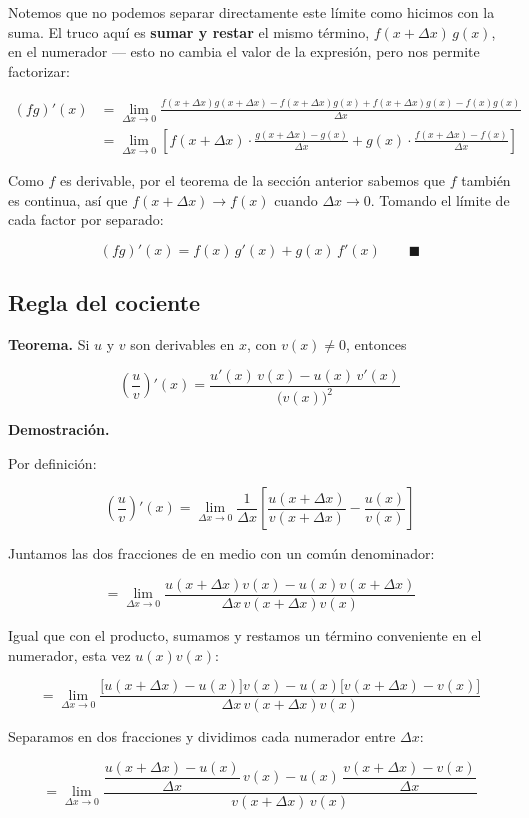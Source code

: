 \documentclass[12pt,tikz,border=5pt]{article}
\begin{document}
Notemos que no podemos separar directamente este límite como hicimos con la
suma. El truco aquí es \textbf{sumar y restar} el mismo término,
$f(x+\Delta x)\,g(x)$, en el numerador — esto no cambia el valor de la
expresión, pero nos permite factorizar:

\begin{align*}
(fg)'(x) &= \lim_{\Delta x\to 0}\frac{f(x+\Delta x)g(x+\Delta x) - f(x+\Delta x)g(x) + f(x+\Delta x)g(x) - f(x)g(x)}{\Delta x} \\[4pt]
&= \lim_{\Delta x\to 0}\left[f(x+\Delta x)\cdot\frac{g(x+\Delta x)-g(x)}{\Delta x} + g(x)\cdot\frac{f(x+\Delta x)-f(x)}{\Delta x}\right]
\end{align*}

Como $f$ es derivable, por el teorema de la sección anterior sabemos que
$f$ también es continua, así que $f(x+\Delta x)\to f(x)$ cuando
$\Delta x\to 0$. Tomando el límite de cada factor por separado:

$$(fg)'(x) = f(x)\,g'(x) + g(x)\,f'(x) \qquad \blacksquare$$

\subsection{Regla del cociente}

\textbf{Teorema.} Si $u$ y $v$ son derivables en $x$, con $v(x)\ne 0$,
entonces

$$\left(\frac{u}{v}\right)'(x) = \frac{u'(x)\,v(x) - u(x)\,v'(x)}{\big(v(x)\big)^2}$$

\textbf{Demostración.}

Por definición:

$$\left(\frac{u}{v}\right)'(x) = \lim_{\Delta x\to 0}\frac{1}{\Delta x}\left[\frac{u(x+\Delta x)}{v(x+\Delta x)} - \frac{u(x)}{v(x)}\right]$$

Juntamos las dos fracciones de en medio con un común denominador:

$$= \lim_{\Delta x\to 0}\frac{u(x+\Delta x)v(x) - u(x)v(x+\Delta x)}{\Delta x\,v(x+\Delta x)v(x)}$$

Igual que con el producto, sumamos y restamos un término conveniente en el
numerador, esta vez $u(x)v(x)$:

$$= \lim_{\Delta x\to 0}\frac{\big[u(x+\Delta x)-u(x)\big]v(x) - u(x)\big[v(x+\Delta x)-v(x)\big]}{\Delta x\,v(x+\Delta x)v(x)}$$

Separamos en dos fracciones y dividimos cada numerador entre $\Delta x$:

$$= \lim_{\Delta x\to 0}\frac{\dfrac{u(x+\Delta x)-u(x)}{\Delta x}\,v(x) - u(x)\,\dfrac{v(x+\Delta x)-v(x)}{\Delta x}}{v(x+\Delta x)\,v(x)}$$
\end{document}
